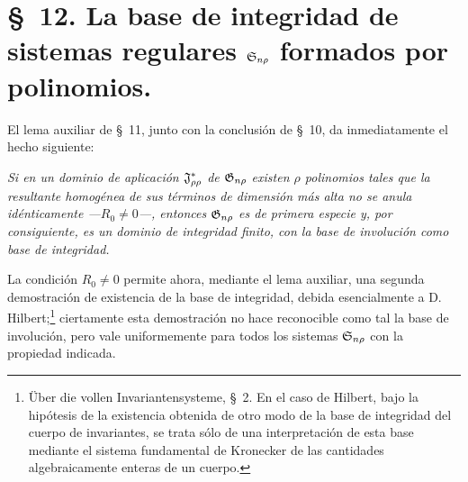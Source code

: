 \documentclass[11pt]{article}
\begin{document}
\section*{\S\ 12. La base de integridad de sistemas regulares $\mathfrak{S}_{n\rho}$ formados por polinomios.}

El lema auxiliar de \S\ 11, junto con la conclusión de \S\ 10, da inmediatamente el hecho siguiente:

\emph{Si en un dominio de aplicación $\mathfrak{J}^*_{\rho\rho}$ de $\mathfrak{G}_{n\rho}$ existen $\rho$ polinomios tales que la resultante homogénea de sus términos de dimensión más alta no se anula idénticamente ---$R_0\ne0$---, entonces $\mathfrak{G}_{n\rho}$ es de primera especie y, por consiguiente, es un dominio de integridad finito, con la base de involución como base de integridad.}

La condición $R_0\ne0$ permite ahora, mediante el lema auxiliar, una segunda demostración de existencia de la base de integridad, debida esencialmente a D. Hilbert;\footnote{Über die vollen Invariantensysteme, \S\ 2. En el caso de Hilbert, bajo la hipótesis de la existencia obtenida de otro modo de la base de integridad del cuerpo de invariantes, se trata sólo de una interpretación de esta base mediante el sistema fundamental de Kronecker de las cantidades algebraicamente enteras de un cuerpo.} ciertamente esta demostración no hace reconocible como tal la base de involución, pero vale uniformemente para todos los sistemas $\mathfrak{S}_{n\rho}$ con la propiedad indicada.
\end{document}
